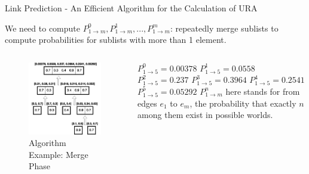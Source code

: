 \documentclass[9pt]{beamer}
\begin{document}
\begin{frame}{Link Prediction - An Efficient Algorithm for the Calculation of URA}

We need to compute $P_{1\rightarrow m}^0, P_{1\rightarrow m}^1, ..., P_{1\rightarrow m}^m$: repeatedly merge sublists to compute probabilities for sublists with more than 1 element.

\begin{columns}[T,onlytextwidth]
      \begin{figure}
      \includegraphics[scale = 0.33]{5_sample_conquer.png}
      \centering
      \caption{Algorithm Example: Merge Phase}
      \label{example}
      \end{figure}

    $P_{1\rightarrow 5}^0 = 0.00378$
    $P_{1\rightarrow 5}^1 = 0.0558$
    $P_{1\rightarrow 5}^2 = 0.237$
    $P_{1\rightarrow 5}^3 = 0.3964$
    $P_{1\rightarrow 5}^4 = 0.2541$
    $P_{1\rightarrow 5}^5 = 0.05292$
    \newline
    \newline
    \newline
    \newline
    \newline
    \small
    $P_{1\rightarrow m}^n$ here stands for from edges $e_1$ to $e_m$, the probability that exactly $n$ among them exist in possible worlds.
  \end{columns}


\end{frame}
\end{document}
